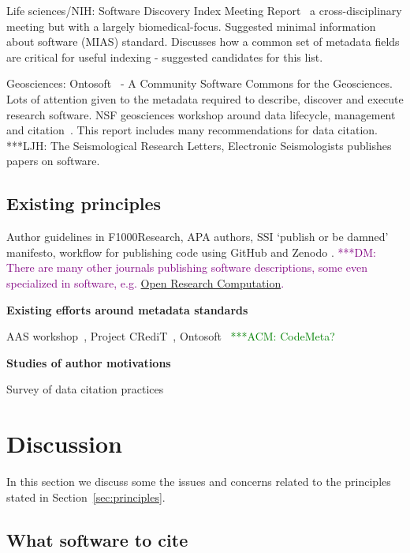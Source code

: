 \documentclass[11pt, oneside]{amsart}
\newcommand{\dmnote}[1]{ {\textcolor{purple} { ***DM: #1 }}} %
\newcommand{\acmnote}[1]{ {\textcolor{green} { ***ACM: #1 }}} %
\newcommand{\LJHnote}[1]{ {\textcolor{fuschsia} { ***LJH: #1 }}} %
\begin{document}
Life sciences/NIH: Software Discovery Index Meeting Report~\cite{software-discovery-index} a cross-disciplinary meeting
but with a largely biomedical-focus. Suggested minimal information about software (MIAS) standard. Discusses how a common set of metadata
fields are critical for useful indexing - suggested candidates for this list.

Geosciences: Ontosoft~\cite{ontosoft} - A Community Software Commons for the Geosciences. Lots of attention given to the metadata
required to describe, discover and execute research software. NSF geosciences workshop around data lifecycle, management and citation~\cite{nsf-geo-data}. This report includes many recommendations for data citation.
\LJHnote{ The Seismological Research Letters, Electronic Seismologists publishes papers on software.} %

\subsection{Existing principles}

Author guidelines in F1000Research, APA authors, SSI `publish or be damned'
\cite{ssi-publish-or-be-damned} manifesto, workflow for publishing code using
GitHub and Zenodo \cite{github-citable-code-guide}.
\dmnote{There are many other journals publishing software descriptions, some even specialized in software, e.g. \href{http://www.openresearchcomputation.com}{Open Research Computation}.}

\textbf{Existing efforts around metadata standards}

AAS workshop~\cite{aas-software-index}, Project CRediT~\cite{casrai-credit}, Ontosoft~\cite{ontosoft}
\acmnote{ CodeMeta? }

\textbf{Studies of author motivations}

Survey of data citation practices \cite{Kratz_2015}


\section{Discussion}
\label{sec:discussion}

In this section we discuss some the issues and concerns related to the principles stated in Section~\ref{sec:principles}.


\subsection{What software to cite}
\end{document}
